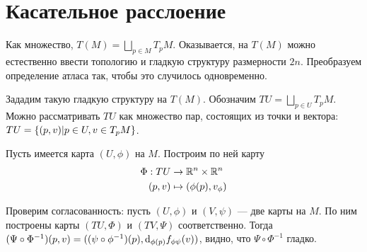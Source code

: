 \documentclass[a4paper]{report}
\begin{document}
    \section{Касательное расслоение}
    Как множество, $T(M) = \bigsqcup\limits_{p \in M}T_p M$.
    Оказывается, на $T(M)$ можно естественно ввести топологию и гладкую структуру размерности $2n$.
    Преобразуем определение атласа так, чтобы это случилось одновременно.

    Зададим такую гладкую структуру на $T(M)$.
    Обозначим $T U = \bigsqcup\limits_{p \in U}T_p M$.
    Можно рассматривать $TU$ как множество пар, состоящих из точки и вектора: $TU = \left\{(p, v)\middle|p \in U, v \in T_p M\right\}$.

    Пусть имеется карта $(U, \phi)$ на $M$.
    Построим по ней карту \begin{align*}\Phi: TU &\rightarrow \mathbb{R}^n \times \mathbb{R}^n \\ (p, v) & \mapsto (\phi(p), v_\phi)\end{align*}

    Проверим согласованность: пусть $(U, \phi)$ и $(V, \psi)$ --- две карты на $M$.
    По ним построены карты $(TU, \Phi)$ и $(TV, \Psi)$ соответственно.
    Тогда $(\Psi \circ \Phi^{-1})(p, v) = ((\psi \circ \phi^{-1})(p), \operatorname{d}\!_{\phi(p)}{f_{\phi\psi}}(v))$, видно, что $\Psi \circ \Phi^{-1}$ гладко.
\end{document}
